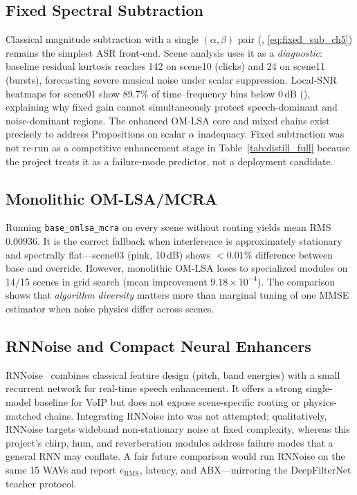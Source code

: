 \subsection{Fixed Spectral Subtraction}

Classical magnitude subtraction with a single $(\alpha,\beta)$ pair (, \eqref{eq:fixed_sub_ch5}) remains the simplest ASR front-end. Scene analysis uses it as a \emph{diagnostic}: baseline residual kurtosis reaches 142 on scene10 (clicks) and 24 on scene11 (bursts), forecasting severe musical noise under scalar suppression. Local-SNR heatmaps for scene01 show 89.7\% of time--frequency bins below 0\,dB (), explaining why fixed gain cannot simultaneously protect speech-dominant and noise-dominant regions. The enhanced OM-LSA core and mixed chains exist precisely to address Propositions on scalar $\alpha$ inadequacy. Fixed subtraction was not re-run as a competitive enhancement stage in Table~\ref{tab:distill_full} because the project treats it as a failure-mode predictor, not a deployment candidate.

\subsection{Monolithic OM-LSA/MCRA}

Running \texttt{base\_omlsa\_mcra} on every scene without routing yields mean RMS $0.00936$. It is the correct fallback when interference is approximately stationary and spectrally flat---scene03 (pink, 10\,dB) shows $<0.01\%$ difference between base and override. However, monolithic OM-LSA loses to specialized modules on 14/15 scenes in grid search (mean improvement $9.18\times 10^{-4}$). The comparison shows that \emph{algorithm diversity} matters more than marginal tuning of one MMSE estimator when noise physics differ across scenes.

\subsection{RNNoise and Compact Neural Enhancers}

RNNoise~\cite{rnnoise2018} combines classical feature design (pitch, band energies) with a small recurrent network for real-time speech enhancement. It offers a strong single-model baseline for VoIP but does not expose scene-specific routing or physics-matched chains. Integrating RNNoise into \projectshort{} was not attempted; qualitatively, RNNoise targets wideband non-stationary noise at fixed complexity, whereas this project's chirp, hum, and reverberation modules address failure modes that a general RNN may conflate. A fair future comparison would run RNNoise on the same 15 WAVs and report $e_{\mathrm{RMS}}$, latency, and ABX---mirroring the DeepFilterNet teacher protocol.

